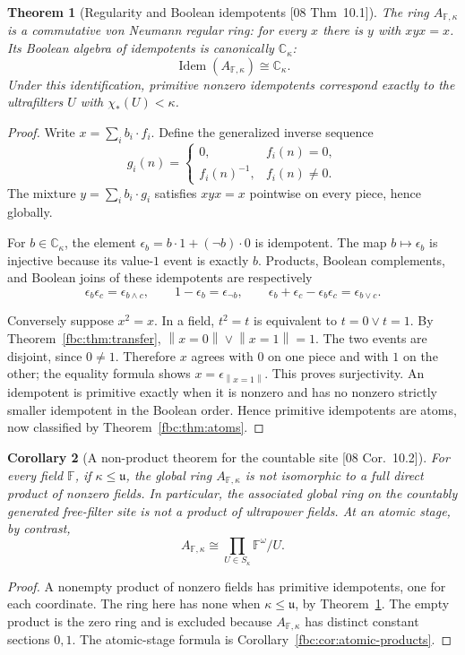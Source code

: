 \documentclass[11pt,letterpaper]{article}
\newtheorem{theorem}{Theorem}[section]
\newtheorem{corollary}[theorem]{Corollary}
\theoremstyle{definition}
\theoremstyle{remark}
\newcommand{\om}{\omega}
\newcommand{\C}{\mathbb C}
\newcommand{\cu}{\mathfrak u}
\newcommand{\Idem}{\operatorname{Idem}}
\newcommand{\Fd}{\mathbb F}
\newcommand{\truth}[1]{\left\lVert #1\right\rVert}
\newcommand{\src}[1]{\textup{[#1]}}
\begin{document}
\begin{theorem}[Regularity and Boolean idempotents \src{08 Thm~10.1}]
\label{fbc:thm:rings}
The ring $A_{\Fd,\kappa}$ is a commutative von Neumann regular ring:
for every $x$ there is $y$ with $xyx=x$. Its Boolean algebra of
idempotents is canonically $\C_\kappa$:
\begin{equation}\label{fbc:eq:idempotents}
 \Idem(A_{\Fd,\kappa})\cong\C_\kappa.
\end{equation}
Under this identification, primitive nonzero idempotents correspond
exactly to the ultrafilters $U$ with $\chi_*(U)<\kappa$.
\end{theorem}
\begin{proof}
Write $x=\sum_i b_i\cdot f_i$. Define the generalized inverse
sequence
\[
 g_i(n)=\begin{cases}
 0,&f_i(n)=0,\\
 f_i(n)^{-1},&f_i(n)\ne0.
 \end{cases}
\]
The mixture $y=\sum_i b_i\cdot g_i$ satisfies $xyx=x$ pointwise
on every piece, hence globally.

For $b\in\C_\kappa$, the element
$\epsilon_b=b\cdot1+(\neg b)\cdot0$ is idempotent. The map
$b\mapsto\epsilon_b$ is injective because its value-$1$ event is
exactly $b$. Products, Boolean complements, and Boolean joins of
these idempotents are respectively
\[
 \epsilon_b\epsilon_c=\epsilon_{b\wedge c},\qquad
 1-\epsilon_b=\epsilon_{\neg b},\qquad
 \epsilon_b+\epsilon_c-\epsilon_b\epsilon_c
       =\epsilon_{b\vee c}.
\]

Conversely suppose $x^2=x$. In a field, $t^2=t$ is equivalent to
$t=0\vee t=1$. By Theorem~\ref{fbc:thm:transfer},
$\truth{x=0}\vee\truth{x=1}=1$. The two events are disjoint,
since $0\ne1$. Therefore $x$ agrees with $0$ on one piece and
with $1$ on the other; the equality formula shows
$x=\epsilon_{\truth{x=1}}$. This proves surjectivity.
An idempotent is primitive exactly when it is nonzero and has no
nonzero strictly smaller idempotent in the Boolean order. Hence
primitive idempotents are atoms, now classified by
Theorem~\ref{fbc:thm:atoms}.
\end{proof}

\begin{corollary}[A non-product theorem for the countable site \src{08 Cor.~10.2}]
\label{fbc:cor:not-product}
For every field $\Fd$, if $\kappa\leq\cu$, the global ring
$A_{\Fd,\kappa}$ is not isomorphic to a full direct product of
nonzero fields. In particular, the associated global ring on the
countably generated free-filter site is not a product of
ultrapower fields. At an atomic stage, by contrast,
\[
 A_{\Fd,\kappa}\cong\prod_{U\in S_\kappa}\Fd^\om/U.
\]
\end{corollary}
\begin{proof}
A nonempty product of nonzero fields has primitive idempotents,
one for each coordinate. The ring here has none when
$\kappa\leq\cu$, by Theorem~\ref{fbc:thm:rings}. The empty product
is the zero ring and is excluded because $A_{\Fd,\kappa}$ has distinct
constant sections $0,1$. The atomic-stage formula is
Corollary~\ref{fbc:cor:atomic-products}.
\end{proof}
\end{document}
